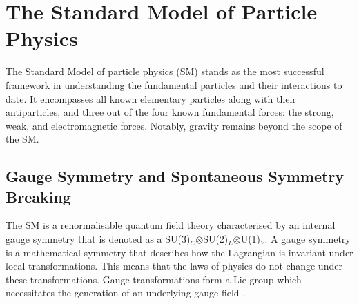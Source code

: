 \documentclass[bachelor,ngerman,english]{GAUBM}
\begin{document}





\chapter{The Standard Model of Particle Physics}
\label{ch:standard_model}
The Standard Model of particle physics (SM) \cite{theory:general_sm} stands as the most successful framework in understanding the fundamental particles and their interactions to date. It encompasses all known elementary particles along with their antiparticles, and three out of the four known fundamental forces: the strong, weak, and electromagnetic forces. Notably, gravity remains beyond the scope of the SM.


\section{Gauge Symmetry and Spontaneous Symmetry Breaking}
\label{sec:theory:gauge_symmetry_and_higgs_meachanism}
The SM is a renormalisable quantum field theory \cite{theory:quantum_fields} characterised by an internal gauge symmetry that is denoted as a SU(3)$_C$$\otimes$SU(2)$_L$$\otimes$U(1)$_Y$. A gauge symmetry is a mathematical symmetry that describes how the Lagrangian is invariant under local transformations. This means that the laws of physics do not change under these transformations. Gauge transformations form a Lie group \cite{theory:lie_groups} which necessitates the generation of an underlying gauge field \cite{theory:gauge_fields}.
\end{document}
